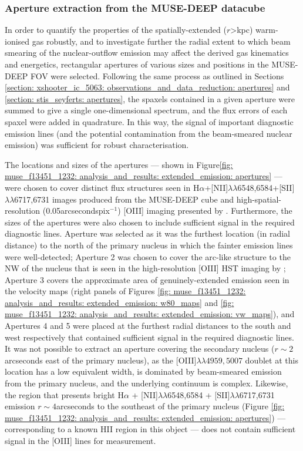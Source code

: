 \subsubsection{Aperture extraction from the MUSE-DEEP datacube}
\label{section: muse_f13451_1232: analysis_and_results: extended_emission: apertures}

In order to quantify the properties of the spatially-extended ($r$\;\textgreater{}\;kpc) warm-ionised gas robustly, and to investigate further the radial extent to which beam smearing of the nuclear-outflow emission may affect the derived gas kinematics and energetics, rectangular apertures of various sizes and positions in the MUSE-DEEP FOV were selected. Following the same process as outlined in Sections \ref{section: xshooter_ic_5063: observations_and_data_reduction: apertures} and \ref{section: stis_seyferts: apertures}, the spaxels contained in a given aperture were summed to give a single one-dimensional spectrum, and the flux errors of each spaxel were added in quadrature. In this way, the signal of important diagnostic emission lines (and the potential contamination from the beam-smeared nuclear emission) was sufficient for robust characterisation.

The locations and sizes of the apertures --- shown in Figure\;\ref{fig: muse_f13451_1232: analysis_and_results: extended_emission: apertures} --- were chosen to cover distinct flux structures seen in H$\alpha$+[NII]$\lambda\lambda$6548,6584+[SII]$\lambda\lambda$6717,6731 images produced from the MUSE-DEEP cube and high-spatial-resolution (0.05\;arcseconds\;pix$^{-1}$) [OIII] imaging presented by \citet{Tadhunter2018}. Furthermore, the sizes of the apertures were also chosen to include sufficient signal in the required diagnostic lines. Aperture was selected as it was the furthest location (in radial distance) to the north of the primary nucleus in which the fainter emission lines were well-detected; Aperture 2 was chosen to cover the arc-like structure to the NW of the nucleus that is seen in the high-resolution [OIII] HST imaging by \citet{Tadhunter2018}; Aperture 3 covers the approximate area of genuinely-extended emission seen in the velocity maps (right panels of Figures \ref{fig: muse_f13451_1232: analysis_and_results: extended_emission: w80_maps} and \ref{fig: muse_f13451_1232: analysis_and_results: extended_emission: vw_maps}), and Apertures 4 and 5 were placed at the furthest radial distances to the south and west respectively that contained sufficient signal in the required diagnostic lines. It was not possible to extract an aperture covering the secondary nucleus ($r\sim2$\;arcseconds east of the primary nucleus), as the [OIII]$\lambda\lambda4959,5007$ doublet at this location has a low equivalent width, is dominated by beam-smeared emission from the primary nucleus, and the underlying continuum is complex. Likewise, the region that presents bright H$\alpha$ + {[}NII{]}$\lambda\lambda$6548,6584 + {[}SII{]}$\lambda\lambda$6717,6731 emission $r\sim4$\;arcseconds to the southeast of the primary nucleus (Figure \ref{fig: muse_f13451_1232: analysis_and_results: extended_emission: apertures}) --- corresponding to a known HII region in this object \citep{RodriguezZaurin2007} --- does not contain sufficient signal in the [OIII] lines for measurement.

